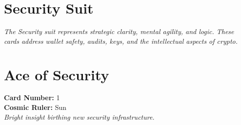 \documentclass[11pt,oneside]{book}
\begin{document}
\section*{Security Suit}

\textit{The Security suit represents strategic clarity, mental agility, and logic. These cards address wallet safety, audits, keys, and the intellectual aspects of crypto.}

\newpage
\section*{Ace of Security}

\begin{minipage}[t]{0.55\textwidth}
  \vspace{0pt}
  \textbf{Card Number:} 1\\  \textbf{Cosmic Ruler:} Sun\\  \textit{Bright insight birthing new security infrastructure.}
\end{minipage}
\end{document}
